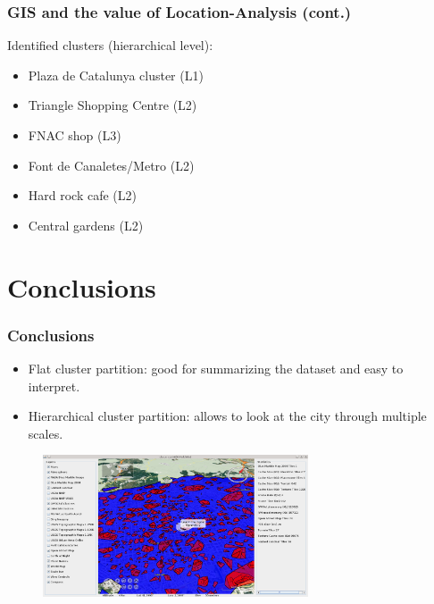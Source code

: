 \documentclass[hyperref={pdfpagelabels=true}]{beamer}
\begin{document}
\begin{frame}
\frametitle{GIS and the value of Location-Analysis (cont.)}
    Identified clusters (hierarchical level):
    \begin{itemize}    
      \item<1->Plaza de Catalunya cluster (L1)
      \item<1->Triangle Shopping Centre (L2)
      \item<1->FNAC shop (L3)
      \item<1->Font de Canaletes/Metro (L2)
      \item<1->Hard rock cafe (L2)
      \item<1->Central gardens (L2)
    \end{itemize}
\end{frame}

\section{Conclusions}
\begin{frame}
\frametitle{Conclusions}
    \begin{itemize}    
      \item<1->Flat cluster partition: good for summarizing the dataset and easy to interpret.
      \item<1->Hierarchical cluster partition: allows to look at the city through multiple scales.%
     \end{itemize}
     
      \begin{figure}  
	\includegraphics[width=0.7\textwidth]{both.png}
       \end{figure}  
     
\end{frame}
\end{document}
